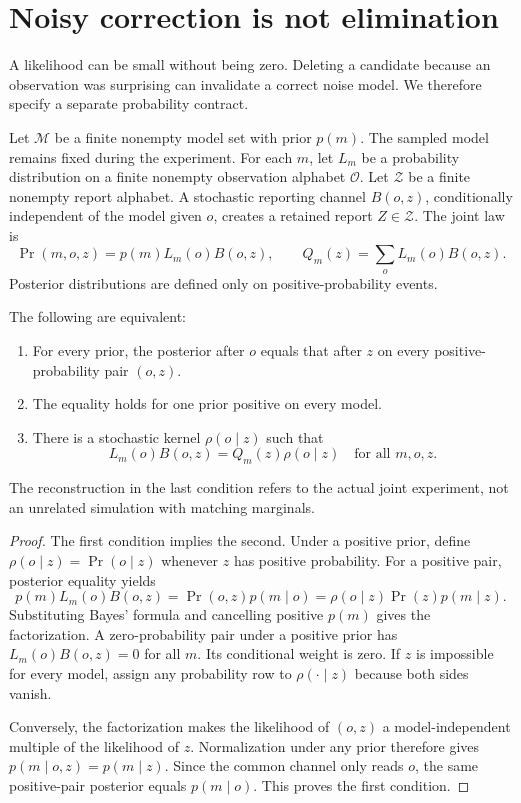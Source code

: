 \section{Noisy correction is not elimination}
A likelihood can be small without being zero. Deleting a candidate because an observation was surprising can invalidate a correct noise model. We therefore specify a separate probability contract.

Let $\mathcal M$ be a finite nonempty model set with prior $p(m)$. The sampled model remains fixed during the experiment. For each $m$, let $L_m$ be a probability distribution on a finite nonempty observation alphabet $\mathcal O$. Let $\mathcal Z$ be a finite nonempty report alphabet. A stochastic reporting channel $B(o,z)$, conditionally independent of the model given $o$, creates a retained report $Z\in\mathcal Z$. The joint law is
\[
\Pr(m,o,z)=p(m)L_m(o)B(o,z),\qquad Q_m(z)=\sum_oL_m(o)B(o,z).
\]
Posterior distributions are defined only on positive-probability events.

\begin{Coretheorem}\label{Core:r:bayes}
The following are equivalent:
\begin{enumerate}
\item For every prior, the posterior after $o$ equals that after $z$ on every positive-probability pair $(o,z)$.
\item The equality holds for one prior positive on every model.
\item There is a stochastic kernel $\rho(o\mid z)$ such that
\[
L_m(o)B(o,z)=Q_m(z)\rho(o\mid z)\quad\text{for all }m,o,z.
\]
\end{enumerate}
The reconstruction in the last condition refers to the actual joint experiment, not an unrelated simulation with matching marginals.
\end{Coretheorem}
\begin{proof}
The first condition implies the second. Under a positive prior, define $\rho(o\mid z)=\Pr(o\mid z)$ whenever $z$ has positive probability. For a positive pair, posterior equality yields
\[
p(m)L_m(o)B(o,z)=\Pr(o,z)p(m\mid o)
=\rho(o\mid z)\Pr(z)p(m\mid z).
\]
Substituting Bayes' formula and cancelling positive $p(m)$ gives the factorization. A zero-probability pair under a positive prior has $L_m(o)B(o,z)=0$ for all $m$. Its conditional weight is zero. If $z$ is impossible for every model, assign any probability row to $\rho(\cdot\mid z)$ because both sides vanish.

Conversely, the factorization makes the likelihood of $(o,z)$ a model-independent multiple of the likelihood of $z$. Normalization under any prior therefore gives $p(m\mid o,z)=p(m\mid z)$. Since the common channel only reads $o$, the same positive-pair posterior equals $p(m\mid o)$. This proves the first condition.
\end{proof}

